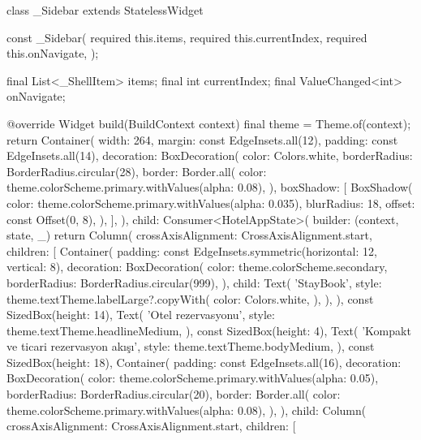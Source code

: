 \documentclass[11pt,a4paper]{article}
\begin{document}
\begin{codeblock}
class _Sidebar extends StatelessWidget {
  const _Sidebar({
    required this.items,
    required this.currentIndex,
    required this.onNavigate,
  });

  final List<_ShellItem> items;
  final int currentIndex;
  final ValueChanged<int> onNavigate;

  @override
  Widget build(BuildContext context) {
    final theme = Theme.of(context);
    return Container(
      width: 264,
      margin: const EdgeInsets.all(12),
      padding: const EdgeInsets.all(14),
      decoration: BoxDecoration(
        color: Colors.white,
        borderRadius: BorderRadius.circular(28),
        border: Border.all(
          color: theme.colorScheme.primary.withValues(alpha: 0.08),
        ),
        boxShadow: [
          BoxShadow(
            color: theme.colorScheme.primary.withValues(alpha: 0.035),
            blurRadius: 18,
            offset: const Offset(0, 8),
          ),
        ],
      ),
      child: Consumer<HotelAppState>(
        builder: (context, state, _) {
          return Column(
            crossAxisAlignment: CrossAxisAlignment.start,
            children: [
              Container(
                padding:
                    const EdgeInsets.symmetric(horizontal: 12, vertical: 8),
                decoration: BoxDecoration(
                  color: theme.colorScheme.secondary,
                  borderRadius: BorderRadius.circular(999),
                ),
                child: Text(
                  'StayBook',
                  style: theme.textTheme.labelLarge?.copyWith(
                    color: Colors.white,
                  ),
                ),
              ),
              const SizedBox(height: 14),
              Text(
                'Otel rezervasyonu',
                style: theme.textTheme.headlineMedium,
              ),
              const SizedBox(height: 4),
              Text(
                'Kompakt ve ticari rezervasyon akışı',
                style: theme.textTheme.bodyMedium,
              ),
              const SizedBox(height: 18),
              Container(
                padding: const EdgeInsets.all(16),
                decoration: BoxDecoration(
                  color: theme.colorScheme.primary.withValues(alpha: 0.05),
                  borderRadius: BorderRadius.circular(20),
                  border: Border.all(
                    color: theme.colorScheme.primary.withValues(alpha: 0.08),
                  ),
                ),
                child: Column(
                  crossAxisAlignment: CrossAxisAlignment.start,
                  children: [
}}}
\end{codeblock}
\end{document}
